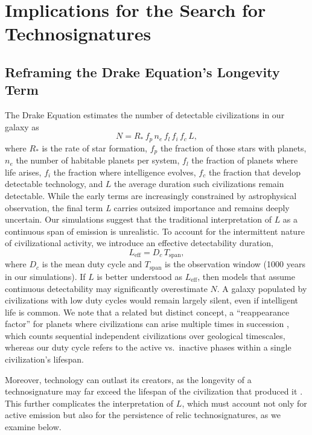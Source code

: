 \section{Implications for the Search for Technosignatures}\label{technosignatures-implications}

\subsection{Reframing the Drake Equation's Longevity Term}\label{reframing-drake}

The Drake Equation \citep{Drake1965-wp} estimates the number of detectable civilizations in our galaxy as
\begin{equation}
N = R_*\, f_p\, n_e\, f_l\, f_i\, f_c\, L ,
\label{eq:drake}
\end{equation}
where \(R_{*}\) is the rate of star formation, \(f_{p}\) the fraction of those stars with planets, \(n_{e}\) the number of habitable planets per system, \(f_{l}\) the fraction of planets where life arises, \(f_{i}\) the fraction where intelligence evolves, \(f_{c}\) the fraction that develop detectable technology, and \(L\) the average duration such civilizations remain detectable. While the early terms are increasingly constrained by astrophysical observation, the final term \emph{L} carries outsized importance and remains deeply uncertain. Our simulations suggest that the traditional interpretation of $L$ as a continuous span of emission is unrealistic. To account for the intermittent nature of civilizational activity, we introduce an effective detectability duration,
\begin{equation}
L_{\mathrm{eff}} = D_c \, T_{\mathrm{span}} ,
\label{eq:leff}
\end{equation}
where \(D_{c}\) is the mean duty cycle and \(T_{\mathrm{span}}\) is the observation window (1000 years in our simulations). If $L$ is better understood as $L_{\mathrm{eff}}$, then models that assume continuous detectability may significantly overestimate $N$. A galaxy populated by civilizations with low duty cycles would remain largely silent, even if intelligent life is common. We note that a related but distinct concept, a ``reappearance factor'' for planets where civilizations can arise multiple times in succession \citep{Bhattacharya2011-qr}, which counts sequential independent civilizations over geological timescales, whereas our duty cycle refers to the active vs.\ inactive phases within a single civilization's lifespan.

Moreover, technology can outlast its creators, as the longevity of a technosignature may far exceed the lifespan of the civilization that produced it \citep{Wright2022-wh,Cirkovic2019-oq}. This further complicates the interpretation of $L$, which must account not only for active emission but also for the persistence of relic technosignatures, as we examine below.

